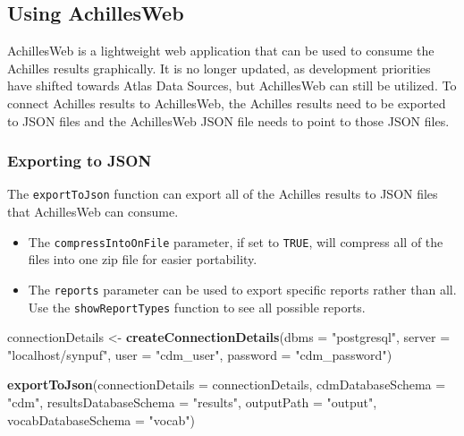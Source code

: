 \documentclass[]{article}
\newenvironment{Shaded}{\begin{snugshade}}{\end{snugshade}}
\newcommand{\KeywordTok}[1]{\textcolor[rgb]{0.13,0.29,0.53}{\textbf{#1}}}
\newcommand{\DataTypeTok}[1]{\textcolor[rgb]{0.13,0.29,0.53}{#1}}
\newcommand{\StringTok}[1]{\textcolor[rgb]{0.31,0.60,0.02}{#1}}
\newcommand{\NormalTok}[1]{#1}
\providecommand{\tightlist}{%
  \setlength{\itemsep}{0pt}\setlength{\parskip}{0pt}}
\begin{document}
\subsection{Using AchillesWeb}\label{using-achillesweb}

AchillesWeb is a lightweight web application that can be used to consume
the Achilles results graphically. It is no longer updated, as
development priorities have shifted towards Atlas Data Sources, but
AchillesWeb can still be utilized. To connect Achilles results to
AchillesWeb, the Achilles results need to be exported to JSON files and
the AchillesWeb JSON file needs to point to those JSON files.

\subsubsection{Exporting to JSON}\label{exporting-to-json}

The \texttt{exportToJson} function can export all of the Achilles
results to JSON files that AchillesWeb can consume.

\begin{itemize}
\tightlist
\item
  The \texttt{compressIntoOnFile} parameter, if set to \texttt{TRUE},
  will compress all of the files into one zip file for easier
  portability.
\item
  The \texttt{reports} parameter can be used to export specific reports
  rather than all. Use the \texttt{showReportTypes} function to see all
  possible reports.
\end{itemize}

\begin{Shaded}
\begin{Highlighting}[]
\NormalTok{connectionDetails <-}\StringTok{ }\KeywordTok{createConnectionDetails}\NormalTok{(}\DataTypeTok{dbms =} \StringTok{"postgresql"}\NormalTok{, }
                                             \DataTypeTok{server =} \StringTok{"localhost/synpuf"}\NormalTok{, }
                                             \DataTypeTok{user =} \StringTok{"cdm_user"}\NormalTok{, }
                                             \DataTypeTok{password =} \StringTok{"cdm_password"}\NormalTok{)}

\KeywordTok{exportToJson}\NormalTok{(}\DataTypeTok{connectionDetails =}\NormalTok{ connectionDetails, }
             \DataTypeTok{cdmDatabaseSchema =} \StringTok{"cdm"}\NormalTok{, }
             \DataTypeTok{resultsDatabaseSchema =} \StringTok{"results"}\NormalTok{, }
             \DataTypeTok{outputPath =} \StringTok{"output"}\NormalTok{, }
             \DataTypeTok{vocabDatabaseSchema =} \StringTok{"vocab"}\NormalTok{)}
\end{Highlighting}
\end{Shaded}
\end{document}
